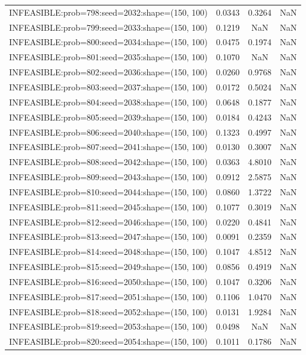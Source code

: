 \begin{longtable}{lccc}
INFEASIBLE:prob=798:seed=2032:shape=(150, 100) & 0.0343 &  0.3264 &    NaN \\
INFEASIBLE:prob=799:seed=2033:shape=(150, 100) & 0.1219 &     NaN &    NaN \\
INFEASIBLE:prob=800:seed=2034:shape=(150, 100) & 0.0475 &  0.1974 &    NaN \\
INFEASIBLE:prob=801:seed=2035:shape=(150, 100) & 0.1070 &     NaN &    NaN \\
INFEASIBLE:prob=802:seed=2036:shape=(150, 100) & 0.0260 &  0.9768 &    NaN \\
INFEASIBLE:prob=803:seed=2037:shape=(150, 100) & 0.0172 &  0.5024 &    NaN \\
INFEASIBLE:prob=804:seed=2038:shape=(150, 100) & 0.0648 &  0.1877 &    NaN \\
INFEASIBLE:prob=805:seed=2039:shape=(150, 100) & 0.0184 &  0.4243 &    NaN \\
INFEASIBLE:prob=806:seed=2040:shape=(150, 100) & 0.1323 &  0.4997 &    NaN \\
INFEASIBLE:prob=807:seed=2041:shape=(150, 100) & 0.0130 &  0.3007 &    NaN \\
INFEASIBLE:prob=808:seed=2042:shape=(150, 100) & 0.0363 &  4.8010 &    NaN \\
INFEASIBLE:prob=809:seed=2043:shape=(150, 100) & 0.0912 &  2.5875 &    NaN \\
INFEASIBLE:prob=810:seed=2044:shape=(150, 100) & 0.0860 &  1.3722 &    NaN \\
INFEASIBLE:prob=811:seed=2045:shape=(150, 100) & 0.1077 &  0.3019 &    NaN \\
INFEASIBLE:prob=812:seed=2046:shape=(150, 100) & 0.0220 &  0.4841 &    NaN \\
INFEASIBLE:prob=813:seed=2047:shape=(150, 100) & 0.0091 &  0.2359 &    NaN \\
INFEASIBLE:prob=814:seed=2048:shape=(150, 100) & 0.1047 &  4.8512 &    NaN \\
INFEASIBLE:prob=815:seed=2049:shape=(150, 100) & 0.0856 &  0.4919 &    NaN \\
INFEASIBLE:prob=816:seed=2050:shape=(150, 100) & 0.1047 &  0.3206 &    NaN \\
INFEASIBLE:prob=817:seed=2051:shape=(150, 100) & 0.1106 &  1.0470 &    NaN \\
INFEASIBLE:prob=818:seed=2052:shape=(150, 100) & 0.0131 &  1.9284 &    NaN \\
INFEASIBLE:prob=819:seed=2053:shape=(150, 100) & 0.0498 &     NaN &    NaN \\
INFEASIBLE:prob=820:seed=2054:shape=(150, 100) & 0.1011 &  0.1786 &    NaN \\

\end{longtable}
